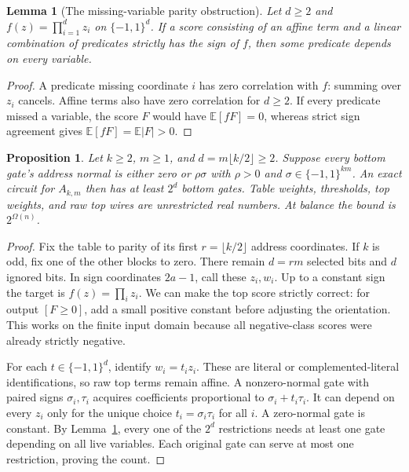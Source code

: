 \documentclass[11pt]{article}
\newtheorem{lemma}[theorem]{Lemma}
\newtheorem{proposition}[theorem]{Proposition}
\begin{document}
\begin{lemma}[The missing-variable parity obstruction]\label{lem:paritydual}
Let $d\ge2$ and $f(z)=\prod_{i=1}^d z_i$ on $\{-1,1\}^d$.
If a score consisting of an affine term and a linear combination of
predicates strictly has the sign of $f$, then some predicate depends
on every variable.
\end{lemma}
\begin{proof}
A predicate missing coordinate $i$ has zero correlation with $f$:
summing over $z_i$ cancels. Affine terms also have zero correlation for
$d\ge2$. If every predicate missed a variable, the score $F$ would have
$\mathbb E[fF]=0$, whereas strict sign agreement gives
$\mathbb E[fF]=\mathbb E|F|>0$.
\end{proof}

\begin{proposition}\label{thm:fullsign}
Let $k\ge2$, $m\ge1$, and $d=m\lfloor k/2\rfloor\ge2$. Suppose every
bottom gate's address normal is either zero or $\rho\sigma$ with
$\rho>0$ and $\sigma\in\{-1,1\}^{km}$. An exact circuit for $A_{k,m}$
then has at least $2^d$ bottom gates. Table weights, thresholds, top
weights, and raw top wires are unrestricted real numbers.
At balance the bound is $2^{\Omega(n)}$.
\end{proposition}
\begin{proof}
Fix the table to parity of its first $r=\lfloor k/2\rfloor$ address
coordinates. If $k$ is odd, fix one of the other blocks to zero.
There remain $d=rm$ selected bits and $d$ ignored bits. In sign coordinates
$2a-1$, call these $z_i,w_i$. Up to a constant sign the target is
$f(z)=\prod_i z_i$.
We can make the top score strictly correct: for output $[F\ge0]$, add
a small positive constant before adjusting the orientation. This works
on the finite input domain because all negative-class scores were already
strictly negative.

For each $t\in\{-1,1\}^d$, identify $w_i=t_i z_i$.
These are literal or complemented-literal identifications, so raw top
terms remain affine. A nonzero-normal gate with paired signs
$\sigma_i,\tau_i$ acquires coefficients proportional to
$\sigma_i+t_i\tau_i$. It can depend on every $z_i$ only for the unique
choice $t_i=\sigma_i\tau_i$ for all $i$. A zero-normal gate is constant.
By Lemma~\ref{lem:paritydual}, every one of the $2^d$ restrictions needs
at least one gate depending on all live variables. Each original gate
can serve at most one restriction, proving the count.
\end{proof}
\end{document}
